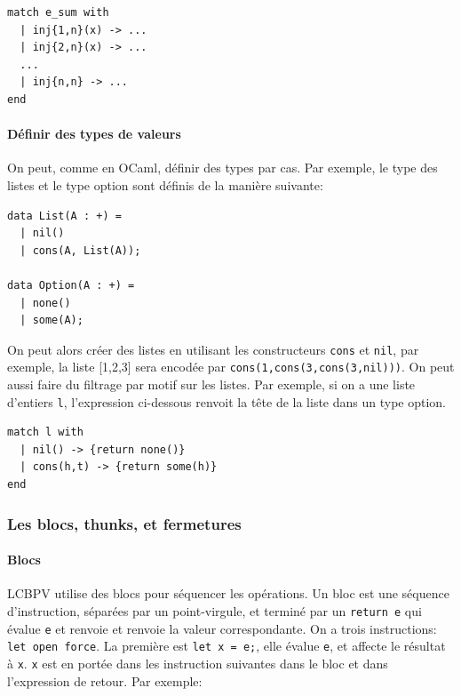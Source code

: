 \documentclass[12pt]{article}
\begin{document}
\begin{verbatim}
match e_sum with
  | inj{1,n}(x) -> ...
  | inj{2,n}(x) -> ...
  ...
  | inj{n,n} -> ...
end
\end{verbatim}

\hypertarget{duxe9finir-des-types-de-valeurs}{%
      \paragraph*{Définir des types de
            valeurs}\label{duxe9finir-des-types-de-valeurs}}

On peut, comme en OCaml, définir des types par cas. Par exemple, le type
des listes et le type option sont définis de la manière suivante:

\begin{verbatim}
data List(A : +) =
  | nil()
  | cons(A, List(A));

data Option(A : +) =
  | none()
  | some(A);
\end{verbatim}

On peut alors créer des listes en utilisant les constructeurs
\texttt{cons} et \texttt{nil}, par exemple, la liste {[}1,2,3{]} sera
encodée par \texttt{cons(1,cons(3,cons(3,nil)))}. On peut aussi faire du
filtrage par motif sur les listes. Par exemple, si on a une liste
d'entiers \texttt{l}, l'expression ci-dessous renvoit la tête de la
liste dans un type option.

\begin{verbatim}
match l with 
  | nil() -> {return none()}
  | cons(h,t) -> {return some(h)}
end 
\end{verbatim}

\hypertarget{les-blocs-thunks-et-fermetures}{%
      \subsubsection*{Les blocs, thunks, et
            fermetures}\label{les-blocs-thunks-et-fermetures}}

\hypertarget{blocs}{%
      \paragraph*{Blocs}\label{blocs}}

LCBPV utilise des blocs pour séquencer les opérations. Un bloc est une
séquence d'instruction, séparées par un point-virgule, et terminé par un
\texttt{return\ e} qui évalue \texttt{e} et renvoie et renvoie la valeur
correspondante. On a trois instructions: \texttt{let\ open\ force}. La
première est \texttt{let\ x\ =\ e;}, elle évalue \texttt{e}, et affecte
le résultat à \texttt{x}. \texttt{x} est en portée dans les instruction
suivantes dans le bloc et dans l'expression de retour. Par exemple:
\end{document}
